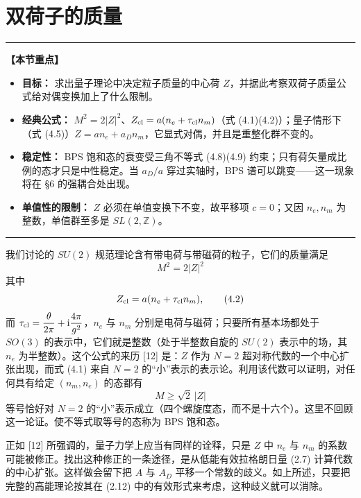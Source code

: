 \documentclass[11pt,a4paper,UTF8,fontset=fandol]{ctexart}
\theoremstyle{plain}
\theoremstyle{definition}
\newenvironment{keypoints}{%
  \par\addvspace{0.9em}%
  \noindent\begin{minipage}{\linewidth}%
  \color{black!80}\rule{\linewidth}{0.6pt}\par\vspace{2pt}%
  \noindent\textbf{【本节重点】}\par\vspace{2pt}%
  \begin{itemize}[leftmargin=1.6em,itemsep=1pt,topsep=2pt,parsep=0pt]%
}{%
  \end{itemize}\vspace{1pt}\noindent\color{black!80}\rule{\linewidth}{0.6pt}%
  \end{minipage}\par\addvspace{0.9em}%
}
\newcommand{\Z}{\mathbb{Z}}
\newcommand{\ii}{\mathrm{i}}
\newcommand{\Nc}{\mathcal{N}}
\def\Nc{N}%
\begin{document}

\section{双荷子的质量}
\begin{keypoints}
  \item \textbf{目标：} 求出量子理论中决定粒子质量的中心荷 $Z$，并据此考察双荷子质量公式给对偶变换加上了什么限制。
  \item \textbf{经典公式：} $M^2=2|Z|^2$、$Z_{\rm cl}=a(n_e+\tau_{\rm cl}n_m)$（式 (4.1)(4.2)）；量子情形下（式 (4.5)）$Z=an_e+a_Dn_m$，它显式对偶，并且是重整化群不变的。
  \item \textbf{稳定性：} BPS 饱和态的衰变受三角不等式 (4.8)(4.9) 约束；只有荷矢量成比例的态才只是中性稳定。当 $a_D/a$ 穿过实轴时，BPS 谱可以跳变——这一现象将在 §6 的强耦合处出现。
  \item \textbf{单值性的限制：} $Z$ 必须在单值变换下不变，故平移项 $c=0$；又因 $n_e,n_m$ 为整数，单值群至多是 $SL(2,\Z)$。
\end{keypoints}

我们讨论的 $SU(2)$ 规范理论含有带电荷与带磁荷的粒子，它们的质量满足
\begin{equation}
  M^2=2|Z|^2 \tag{4.1}
\end{equation}
其中
\begin{equation}
  Z_{\rm cl}=a(n_e+\tau_{\rm cl}n_m), \tag{4.2}
\end{equation}
而 $\tau_{\rm cl}=\dfrac{\theta}{2\pi}+\ii\dfrac{4\pi}{g^2}$，$n_e$ 与 $n_m$ 分别是电荷与磁荷；只要所有基本场都处于 $SO(3)$ 的表示中，它们就是整数（处于半整数自旋的 $SU(2)$ 表示中的场，其 $n_e$ 为半整数）。这个公式的来历 [12] 是：$Z$ 作为 $\Nc=2$ 超对称代数的一个中心扩张出现，而式 (4.1) 来自 $\Nc=2$ 的“小”表示的表示论。利用该代数可以证明，对任何具有给定 $(n_m,n_e)$ 的态都有
\begin{equation}
  M\ge\sqrt2\,|Z| \tag{4.3}
\end{equation}
等号恰好对 $\Nc=2$ 的“小”表示成立（四个螺旋度态，而不是十六个）。这里不回顾这一论证。使不等式取等号的态称为 BPS 饱和态。

正如 [12] 所强调的，量子力学上应当有同样的诠释，只是 $Z$ 中 $n_e$ 与 $n_m$ 的系数可能被修正。找出这种修正的一条途径，是从低能有效拉格朗日量 (2.7) 计算代数的中心扩张。这样做会留下把 $A$ 与 $A_D$ 平移一个常数的歧义。如上所述，只要把完整的高能理论按其在 (2.12) 中的有效形式来考虑，这种歧义就可以消除。
\end{document}
